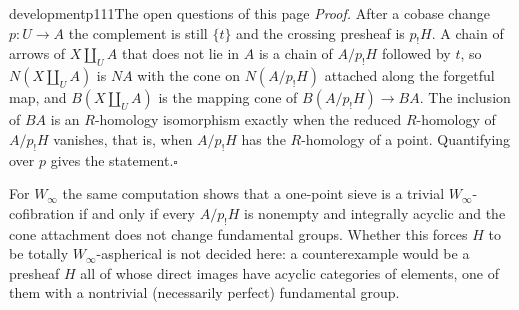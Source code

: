 \begin{dcomment}{development}{p111}{The open questions of this page}
\textit{Proof.}
After a cobase change $p:U\to A$ the complement is still $\{t\}$ and the crossing presheaf is $p_!H$. A chain of arrows of $X\amalg_UA$ that does not lie in $A$ is a chain of $A/p_!H$ followed by $t$, so $N(X\amalg_UA)$ is $NA$ with the cone on $N(A/p_!H)$ attached along the forgetful map, and $B(X\amalg_UA)$ is the mapping cone of $B(A/p_!H)\to BA$. The inclusion of $BA$ is an $R$-homology isomorphism exactly when the reduced $R$-homology of $A/p_!H$ vanishes, that is, when $A/p_!H$ has the $R$-homology of a point. Quantifying over $p$ gives the statement.\hfill$\square$

For $W_\infty$ the same computation shows that a one-point sieve is a trivial $W_\infty$-cofibration if and only if every $A/p_!H$ is nonempty and integrally acyclic and the cone attachment does not change fundamental groups. Whether this forces $H$ to be totally $W_\infty$-aspherical is not decided here: a counterexample would be a presheaf $H$ all of whose direct images have acyclic categories of elements, one of them with a nontrivial (necessarily perfect) fundamental group.
\end{dcomment}

